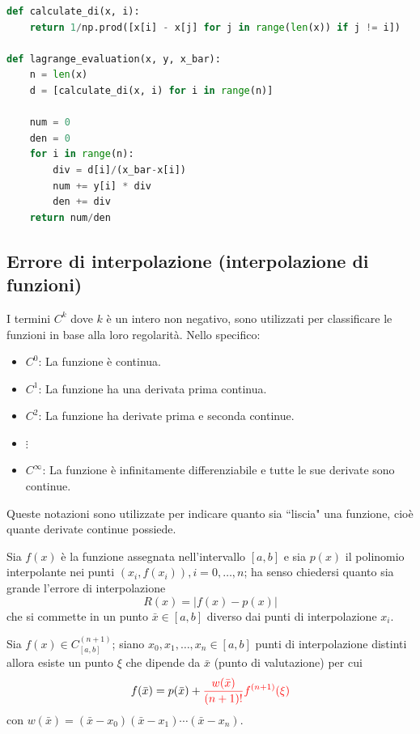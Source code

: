 \documentclass{article}
\begin{document}
\begin{lstlisting}[language=Python]
def calculate_di(x, i):
    return 1/np.prod([x[i] - x[j] for j in range(len(x)) if j != i])

def lagrange_evaluation(x, y, x_bar):
    n = len(x)
    d = [calculate_di(x, i) for i in range(n)]
    
    num = 0
    den = 0
    for i in range(n):
        div = d[i]/(x_bar-x[i])
        num += y[i] * div
        den += div
    return num/den
\end{lstlisting}
\subsection{Errore di interpolazione (interpolazione di funzioni)}
\begin{recap}
    I termini \( C^k \) dove \( k \) è un intero non negativo, sono utilizzati per classificare le funzioni in base alla loro regolarità. Nello specifico:
    \begin{itemize}
        \item \( C^0 \): La funzione è continua.
        \item \( C^1 \): La funzione ha una derivata prima continua.
        \item \( C^2 \): La funzione ha derivate prima e seconda continue.
        \item \( \vdots \)
        \item \( C^\infty \): La funzione è infinitamente differenziabile e tutte le sue derivate sono continue.
    \end{itemize}
    Queste notazioni sono utilizzate per indicare quanto sia ``liscia" una funzione, cioè quante derivate continue possiede.
\end{recap}
Sia $f(x)$ è la funzione assegnata nell'intervallo $[a,b]$ e sia $p(x)$ il
polinomio interpolante nei punti $(x_i,f(x_i)),i=0,\ldots,n$; ha senso chiedersi quanto sia grande l'errore di
interpolazione
$$R(x)=\left\lvert f(x)-p(x)\right\rvert$$
che si commette in un punto $\bar{x}\in[a,b]$ diverso dai punti di
interpolazione $x_i$.
\begin{theorem}
    Sia $f(x)\in C_{[a,b]}^{(n+1)}$; siano $x_0,x_1,\ldots,x_n\in[a,b]$ punti
    di interpolazione distinti allora esiste un punto $\xi$ che dipende da
    $\bar{x}$ (punto di valutazione) per cui 
    \begin{equation}\label{eq:errore_interpolazione}
        \begin{aligned}
            f(\bar{x})=p(\bar{x})+{\color{red}\frac{w(\bar{x})}{(n+1)!}f^{(n+1)}(\xi)}
        \end{aligned}
    \end{equation}
    con $w(\bar{x})=(\bar{x}-x_0)(\bar{x}-x_1)\cdots(\bar{x}-x_n)$.
\end{theorem}
\end{document}
